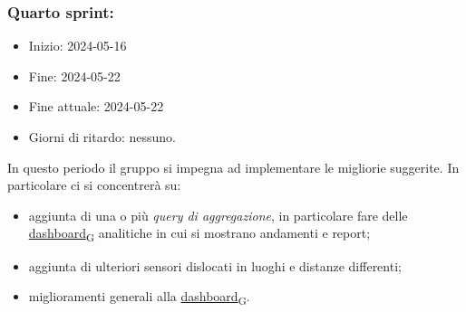 \newpage
\subsubsection{Quarto sprint:}
\begin{itemize}
	\item Inizio: 2024-05-16
	\item Fine: 2024-05-22
	\item Fine attuale: 2024-05-22
	\item Giorni di ritardo: nessuno.
\end{itemize}

In questo periodo il gruppo si impegna ad implementare le migliorie suggerite.
In particolare ci si concentrerà su:
\begin{itemize}
	\item aggiunta di una o più \textit{query di aggregazione}, in particolare fare delle \href{https://7last.github.io/docs/rtb/documentazione-interna/glossario\#dashboard}{dashboard\textsubscript{G}} analitiche in cui si
	      mostrano andamenti e report;
	\item aggiunta di ulteriori sensori dislocati in luoghi e distanze differenti;
	\item miglioramenti generali alla \href{https://7last.github.io/docs/rtb/documentazione-interna/glossario\#dashboard}{dashboard\textsubscript{G}}.
\end{itemize}

